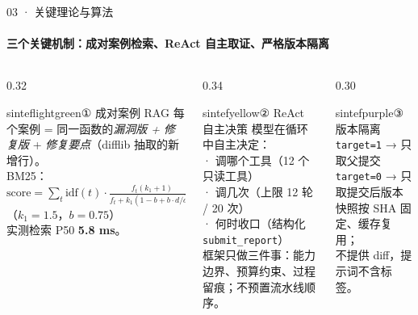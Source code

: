 \documentclass{beamer}
\begin{document}
\begin{frame}{03 · 关键理论与算法}
\framesubtitle{三个关键机制：成对案例检索、ReAct 自主取证、严格版本隔离}
\footnotesize
\begin{columns}[t]
\begin{column}{0.32\textwidth}
\begin{colorblock}[black]{sinteflightgreen}{① 成对案例 RAG}
\scriptsize
每个案例 = 同一函数的\emph{漏洞版 + 修复版} + \emph{修复要点}（difflib 抽取的新增行）。\\[0.3em]
BM25：$\text{score}=\sum_{t}\text{idf}(t)\cdot\frac{f_t(k_1+1)}{f_t+k_1(1-b+b\cdot d/\bar d)}$\\[0.2em]
（$k_1=1.5$，$b=0.75$）\\[0.3em]
实测检索 P50 \textbf{5.8 ms}。
\end{colorblock}
\end{column}
\begin{column}{0.34\textwidth}
\begin{colorblock}[black]{sintefyellow}{② ReAct 自主决策}
\scriptsize
模型在循环中自主决定：\\
· 调哪个工具（12 个只读工具）\\
· 调几次（上限 12 轮 / 20 次）\\
· 何时收口（结构化 \texttt{submit\_report}）\\[0.3em]
框架只做三件事：能力边界、预算约束、过程留痕；不预置流水线顺序。
\end{colorblock}
\end{column}
\begin{column}{0.30\textwidth}
\begin{colorblock}[white]{sintefpurple}{③ 版本隔离}
\scriptsize
\texttt{target=1} → 只取父提交\\
\texttt{target=0} → 只取提交后版本\\[0.3em]
快照按 SHA 固定、缓存复用；\\不提供 diff，提示词不含标签。
\end{colorblock}
\end{column}
\end{columns}


\end{frame}
\end{document}
